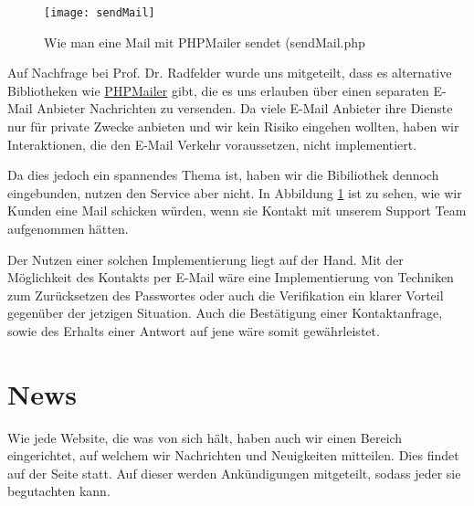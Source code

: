 \begin{figure}[H]
    \begin{center}
        \texttt{[image: sendMail]}
        \caption{Wie man eine Mail mit PHPMailer sendet (sendMail.php}
        \label{fig:sendMail}
    \end{center}
    \centering
\end{figure}

Auf Nachfrage bei Prof. Dr. Radfelder wurde uns mitgeteilt, dass es alternative Bibliotheken wie \href{https://github.com/PHPMailer/PHPMailer}{PHPMailer} gibt, die es uns erlauben über einen separaten E-Mail Anbieter Nachrichten zu versenden. Da viele E-Mail Anbieter ihre Dienste nur für private Zwecke anbieten und wir kein Risiko eingehen wollten, haben wir Interaktionen, die den E-Mail Verkehr voraussetzen, nicht implementiert.

Da dies jedoch ein spannendes Thema ist, haben wir die Bibiliothek dennoch eingebunden, nutzen den Service aber nicht. In Abbildung \ref{fig:sendMail} ist zu sehen, wie wir Kunden eine Mail schicken würden, wenn sie Kontakt mit unserem Support Team aufgenommen hätten.

Der Nutzen einer solchen Implementierung liegt auf der Hand. Mit der Möglichkeit des Kontakts per E-Mail wäre eine Implementierung von Techniken zum Zurücksetzen des Passwortes oder auch die Verifikation ein klarer Vorteil gegenüber der jetzigen Situation. Auch die Bestätigung einer Kontaktanfrage, sowie des Erhalts einer Antwort auf jene wäre somit gewährleistet. \\

\section{News}
Wie jede Website, die was von sich hält, haben auch wir einen Bereich eingerichtet, auf welchem wir Nachrichten und Neuigkeiten mitteilen. Dies findet auf der Seite  statt. Auf dieser werden Ankündigungen mitgeteilt, sodass jeder sie begutachten kann.
